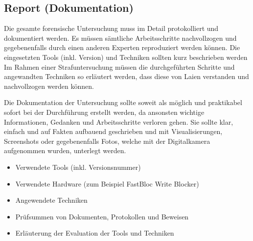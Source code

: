 \subsection{Report (Dokumentation)}
Die gesamte forensische Untersuchung muss im Detail protokolliert und dokumentiert werden. Es müssen sämtliche Arbeitsschritte nachvollzogen und gegebenenfalls durch einen anderen Experten reproduziert werden können. Die eingesetzten Tools (inkl. Version) und Techniken sollten kurz beschrieben werden Im Rahmen einer Strafuntersuchung müssen die durchgeführten Schritte und angewandten Techniken so erläutert werden, dass diese von Laien verstanden und nachvollzogen werden können.

Die Dokumentation der Untersuchung sollte soweit als möglich und praktikabel sofort bei der Durchführung erstellt werden, da ansonsten wichtige Informationen, Gedanken und Arbeitsschritte verloren gehen. Sie sollte klar, einfach und auf Fakten aufbauend geschrieben und mit Visualisierungen, Screenshots oder gegebenenfalls Fotos, welche mit der Digitalkamera aufgenommen wurden, unterlegt werden. 

\begin{itemize}
\item Verwendete Tools (inkl. Versionsnummer)
\item Verwendete Hardware (zum Beispiel FastBloc Write Blocker)
\item Angewendete Techniken
\item Prüfsummen von Dokumenten, Protokollen und Beweisen
\item Erläuterung der Evaluation der Tools und Techniken
\end{itemize}

